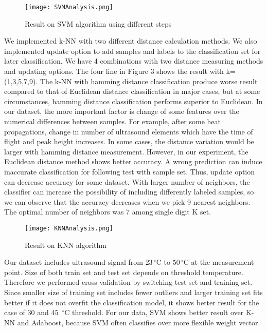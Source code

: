 \documentclass[11pt,letterpaper]{article}
\begin{document}
 	\begin{figure}[!htbp]
 		\texttt{[image: SVMAnalysis.png]}
 		\caption{Result on SVM algorithm using different steps}
 		\label{fig:2}       %
 	\end{figure}
%

We implemented k-NN with two different distance calculation methods. We also implemented update option to add samples and labels to the classification set for later classification. We have 4 combinations with two distance measuring methods and updating options. The four line in Figure 3 shows the result with k=(1,3,5,7,9). The k-NN with hamming distance classification produce worse result compared to that of Euclidean distance classification in major cases, but at some circumstances, hamming distance classification performs superior to Euclidean. In our dataset, the more important factor is change of some features over the numerical differences between samples. For example, after some heat propagations, change in number of ultrasound elements which have the time of flight and peak height increases. In some cases, the distance variation would be larger with hamming distance measurement. However, in our experiment, the Euclidean distance method shows better accuracy. A wrong prediction can induce inaccurate classification for following test with sample set. Thus, update option can decrease accuracy for some dataset. With larger number of neighbors, the classifier can increase the possibility of including differently labeled samples, so we can observe that the accuracy decreases when we pick 9 nearest neighbors. The optimal number of neighbors was 7 among single digit K set.

 	\begin{figure}[!htp]
 		\texttt{[image: KNNAnalysis.png]}
 		\caption{Result on KNN algorithm}
 		\label{fig:3}       %
 	\end{figure}
%

Our dataset includes ultrasound signal from $23\,^{\circ}\mathrm{C}$ to $50\,^{\circ}\mathrm{C}$ at the measurement point. Size of both train set and test set depends on threshold temperature. Therefore we performed cross validation by switching test set and training set. Since smaller size of training set includes fewer outliers and larger training set fits better if it does not overfit the classification model, it shows better result for the case of 30 and 45 $\,^{\circ}\mathrm{C}$ threshold. For our data, SVM shows better result over K-NN and Adaboost, because SVM often classifies over more flexible weight vector.  
\end{document}
